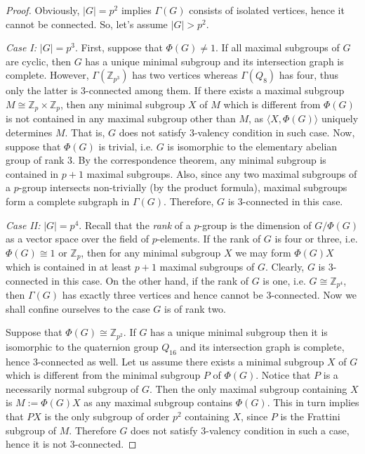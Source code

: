 \documentclass[a4paper,12pt]{article}
\theoremstyle{definition}
\theoremstyle{remark}
\theoremstyle{theorem}
\begin{document}
\begin{proof}
  Obviously, $|G|=p^2$ implies $\Gamma(G)$ consists of isolated
  vertices, hence it cannot be connected. So, let's assume $|G|>p^2$.

  \emph{Case I:} $|G|=p^3$. First, suppose that $\Phi(G)\neq 1$. If
  all maximal subgroups of $G$ are cyclic, then $G$ has a unique
  minimal subgroup and its intersection graph is complete. However,
  $\Gamma(\mathbb{Z}_{p^3})$ has two vertices whereas $\Gamma(Q_8)$
  has four, thus only the latter is $3$-connected among them. If there
  exists a maximal subgroup $M\cong \mathbb{Z}_p\times\mathbb{Z}_p$,
  then any minimal subgroup $X$ of $M$ which is different from
  $\Phi(G)$ is not contained in any maximal subgroup other than $M$,
  as $\langle X,\Phi(G)\rangle$ uniquely determines $M$. That is, $G$
  does not satisfy $3$-valency condition in such case. Now, suppose
  that $\Phi(G)$ is trivial, i.e. $G$ is isomorphic to the elementary
  abelian group of rank $3$. By the correspondence theorem, any
  minimal subgroup is contained in $p+1$ maximal subgroups. Also,
  since any two maximal subgroups of a $p$-group intersects
  non-trivially (by the product formula), maximal subgroups form a
  complete subgraph in $\Gamma(G)$. Therefore, $G$ is $3$-connected in
  this case.

  \emph{Case II:} $|G|=p^4$. Recall that the \emph{rank} of a
  $p$-group is the dimension of $G/\Phi(G)$ as a vector space over the
  field of $p$-elements. If the rank of $G$ is four or three,
  i.e. $\Phi(G)\cong 1 \text{ or } \mathbb{Z}_p$, then for any minimal
  subgroup $X$ we may form $\Phi(G)X$ which is contained in at least
  $p+1$ maximal subgroups of $G$. Clearly, $G$ is $3$-connected in
  this case. On the other hand, if the rank of $G$ is one,
  i.e. $G\cong \mathbb{Z}_{p^4}$, then $\Gamma(G)$ has exactly three
  vertices and hence cannot be $3$-connected. Now we shall confine
  ourselves to the case $G$ is of rank two.

  Suppose that $\Phi(G)\cong\mathbb{Z}_{p^2}$. If $G$ has a unique
  minimal subgroup then it is isomorphic to the quaternion group
  $Q_{16}$ and its intersection graph is complete, hence $3$-connected
  as well. Let us assume there exists a minimal subgroup $X$ of $G$
  which is different from the minimal subgroup $P$ of
  $\Phi(G)$. Notice that $P$ is a necessarily normal subgroup of
  $G$. Then the only maximal subgroup containing $X$ is $M:=\Phi(G)X$
  as any maximal subgroup contains $\Phi(G)$. This in turn implies
  that $PX$ is the only subgroup of order $p^2$ containing $X$, since
  $P$ is the Frattini subgroup of $M$. Therefore $G$ does not satisfy
  $3$-valency condition in such a case, hence it is not $3$-connected.


\end{proof}
\end{document}
